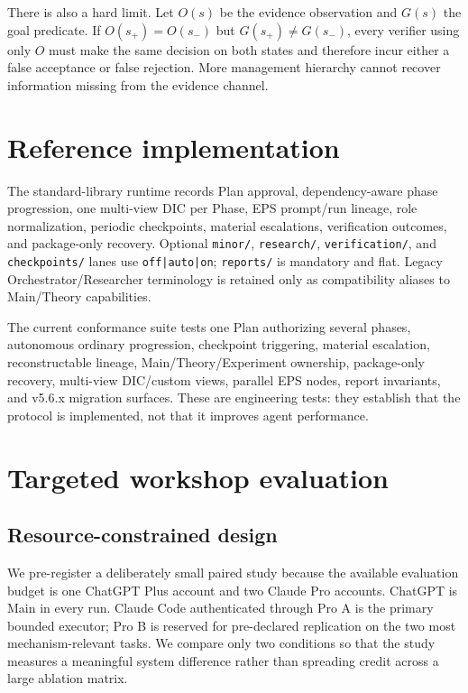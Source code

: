 \documentclass{article}
\begin{document}
There is also a hard limit. Let $O(s)$ be the evidence observation and $G(s)$ the goal predicate. If $O(s_+)=O(s_-)$ but $G(s_+)\neq G(s_-)$, every verifier using only $O$ must make the same decision on both states and therefore incur either a false acceptance or false rejection. More management hierarchy cannot recover information missing from the evidence channel.

\section{Reference implementation}
The standard-library runtime records Plan approval, dependency-aware phase progression, one multi-view DIC per Phase, EPS prompt/run lineage, role normalization, periodic checkpoints, material escalations, verification outcomes, and package-only recovery. Optional \texttt{minor/}, \texttt{research/}, \texttt{verification/}, and \texttt{checkpoints/} lanes use \texttt{off|auto|on}; \texttt{reports/} is mandatory and flat. Legacy Orchestrator/Researcher terminology is retained only as compatibility aliases to Main/Theory capabilities.

The current conformance suite tests one Plan authorizing several phases, autonomous ordinary progression, checkpoint triggering, material escalation, reconstructable lineage, Main/Theory/Experiment ownership, package-only recovery, multi-view DIC/custom views, parallel EPS nodes, report invariants, and v5.6.x migration surfaces. These are engineering tests: they establish that the protocol is implemented, not that it improves agent performance.

\section{Targeted workshop evaluation}
\subsection{Resource-constrained design}
We pre-register a deliberately small paired study because the available evaluation budget is one ChatGPT Plus account and two Claude Pro accounts. ChatGPT is Main in every run. Claude Code authenticated through Pro A is the primary bounded executor; Pro B is reserved for pre-declared replication on the two most mechanism-relevant tasks. We compare only two conditions so that the study measures a meaningful system difference rather than spreading credit across a large ablation matrix.
\end{document}
